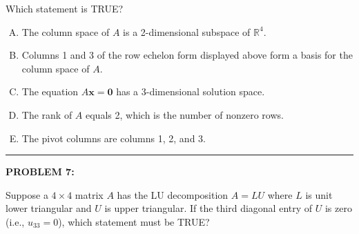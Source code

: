 \documentclass[12pt]{amsart}
\newcommand{\divider}{
  \vspace{-1em} %
  \noindent
  \raisebox{-0.15ex}{\textbullet}%
  \hspace{0.5em}%
  \rule[0.5ex]{0.95\textwidth}{1.0pt}%
  \hspace{0.5em}%
  \raisebox{-0.15ex}{\textbullet}%
  \vspace{0em} %
}
\begin{document}
Which statement is TRUE?

\begin{enumerate}[(A)]
\item The column space of $A$ is a 2-dimensional subspace of $\mathbb{R}^4$.
\item Columns 1 and 3 of the row echelon form displayed above form a basis for the column space of $A$.
\item The equation $A\mathbf{x} = \mathbf{0}$ has a 3-dimensional solution space.
\item The rank of $A$ equals 2, which is the number of nonzero rows.
\item The pivot columns are columns 1, 2, and 3.
\end{enumerate}


\divider

\newpage

{\bf PROBLEM 7:}

Suppose a $4 \times 4$ matrix $A$ has the LU decomposition $A = LU$ where $L$ is unit lower triangular and $U$ is upper triangular. If the third diagonal entry of $U$ is zero (i.e., $u_{33} = 0$), which statement must be TRUE?
\end{document}
